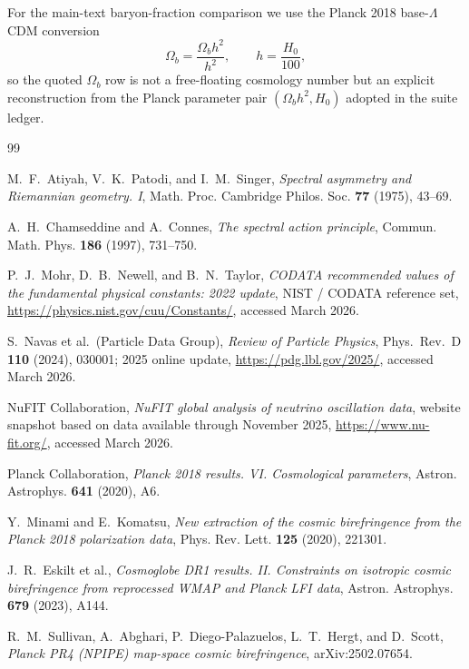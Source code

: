 \documentclass[11pt,a4paper]{article}
\theoremstyle{definition}
\theoremstyle{remark}
\begin{document}
For the main-text baryon-fraction comparison we use the Planck 2018 base-$\Lambda$CDM conversion
\[
\Omega_b=\frac{\Omega_b h^2}{h^2},
\qquad
h=\frac{H_0}{100},
\]
so the quoted $\Omega_b$ row is not a free-floating cosmology number but an explicit reconstruction from the Planck parameter pair $(\Omega_b h^2,H_0)$ adopted in the suite ledger.

\begin{thebibliography}{99}

M.~F.~Atiyah, V.~K.~Patodi, and I.~M.~Singer,
\newblock \emph{Spectral asymmetry and Riemannian geometry. I},
\newblock Math. Proc. Cambridge Philos. Soc. \textbf{77} (1975), 43--69.

A.~H.~Chamseddine and A.~Connes,
\newblock \emph{The spectral action principle},
\newblock Commun. Math. Phys. \textbf{186} (1997), 731--750.

P.~J.~Mohr, D.~B.~Newell, and B.~N.~Taylor,
\newblock \emph{CODATA recommended values of the fundamental physical constants: 2022 update},
\newblock NIST / CODATA reference set, \url{https://physics.nist.gov/cuu/Constants/}, accessed March 2026.

S.~Navas et al.\ (Particle Data Group),
\newblock \emph{Review of Particle Physics},
\newblock Phys.\ Rev.\ D \textbf{110} (2024), 030001; 2025 online update, \url{https://pdg.lbl.gov/2025/}, accessed March 2026.

NuFIT Collaboration,
\newblock \emph{NuFIT global analysis of neutrino oscillation data},
\newblock website snapshot based on data available through November 2025, \url{https://www.nu-fit.org/}, accessed March 2026.

Planck Collaboration,
\newblock \emph{Planck 2018 results. VI. Cosmological parameters},
\newblock Astron. Astrophys. \textbf{641} (2020), A6.

Y.~Minami and E.~Komatsu,
\newblock \emph{New extraction of the cosmic birefringence from the Planck 2018 polarization data},
\newblock Phys. Rev. Lett. \textbf{125} (2020), 221301.

J.~R.~Eskilt et al.,
\newblock \emph{Cosmoglobe DR1 results. II. Constraints on isotropic cosmic birefringence from reprocessed WMAP and Planck LFI data},
\newblock Astron. Astrophys. \textbf{679} (2023), A144.

R.~M.~Sullivan, A.~Abghari, P.~Diego-Palazuelos, L.~T.~Hergt, and D.~Scott,
\newblock \emph{Planck PR4 (NPIPE) map-space cosmic birefringence},
\newblock arXiv:2502.07654.

\end{thebibliography}
\end{document}

